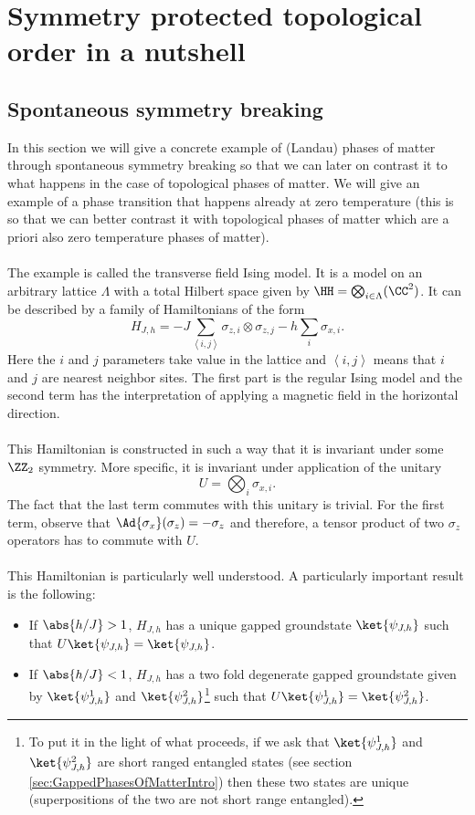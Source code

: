 \chapter{Symmetry protected topological order in a nutshell}\label{sec:SPT_Order_In_A_Nutshell}
\section{Spontaneous symmetry breaking}\label{sec:SpontaniousSymmetryBreaking}
In this section we will give a concrete example of (Landau) phases of matter through spontaneous symmetry breaking so that we can later on contrast it to what happens in the case of topological phases of matter. We will give an example of a phase transition that happens already at zero temperature (this is so that we can better contrast it with  topological phases of matter which are a priori also zero temperature phases of matter).
\\\\
The example is called the transverse field Ising model. It is a model on an arbitrary lattice $\Lambda$ with a total Hilbert space given by $\HH=\bigotimes_{i\in\Lambda}(\CC^2)$. It can be described by a family of Hamiltonians of the form
\begin{equation}
	H_{J,h}=-J\sum_{\left<i,j\right>}\sigma_{z,i}\otimes\sigma_{z,j}-h\sum_{i}\sigma_{x,i}.
\end{equation}
Here the $i$ and $j$ parameters take value in the lattice and $\left<i,j\right>$ means that $i$ and $j$ are nearest neighbor sites. The first part is the regular Ising model and the second term has the interpretation of applying a magnetic field in the horizontal direction.
\\\\
This Hamiltonian is constructed in such a way that it is invariant under some $\ZZ_2$ symmetry. More specific, it is invariant under application of the unitary
\begin{equation}
	U=\bigotimes_{i}\sigma_{x,i}.
\end{equation}
The fact that the last term commutes with this unitary is trivial. For the first term, observe that $\Ad{\sigma_x}(\sigma_z)=-\sigma_z$ and therefore, a tensor product of two $\sigma_z$ operators has to commute with $U$.
\\\\
This Hamiltonian is particularly well understood. A particularly important result is the following:
\begin{itemize}
	\item If $\abs{h/J}>1$, $H_{J,h}$ has a unique gapped groundstate $\ket{\psi_{J,h}}$ such that $U\ket{\psi_{J,h}}=\ket{\psi_{J,h}}$.
	\item If $\abs{h/J}<1$, $H_{J,h}$ has a two fold degenerate gapped groundstate given by $\ket{\psi_{J,h}^1}$ and $\ket{\psi_{J,h}^2}$\footnote{To put it in the light of what proceeds, if we ask that $\ket{\psi_{J,h}^1}$ and $\ket{\psi_{J,h}^2}$ are short ranged entangled states (see section \ref{sec:GappedPhasesOfMatterIntro}) then these two states are unique (superpositions of the two are not short range entangled).} such that $U\ket{\psi_{J,h}^1}=\ket{\psi_{J,h}^2}$.
\end{itemize}
